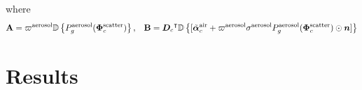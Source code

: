 \documentclass[10pt,letterpaper]{article}
\newcommand{\abbrev}[1]{\rm{#1}}
\newcommand{\vect}[1]{\bm{#1}}
\newcommand{\transpose}[1]{{#1}^\intercal}
\newcommand{\OpDiag}[1]{\mathbb{D}\left\{#1\right\}}
\begin{document}
where
\begin{equation}
  \label{eq:gradient3}
  {\bf A} = \varpi^{\rm aerosol}
  \OpDiag{ P_g^{\rm aerosol}(\vect{\Phi}^{\rm scatter}_c)}
  ,\;\;\;
  {\bf B} = \transpose{{\bm D}_c}
  \OpDiag{[\tilde{\vect{\alpha}}^{\rm air}_c + \varpi^{\rm
      aerosol}\sigma^{\rm aerosol} P^{\rm aerosol}_g(\vect{\Phi}^{\rm
      scatter}_c) \odot{\bm n}    ]}
\end{equation}



\section{Results}
\label{sec:optimization-results}
\end{document}
